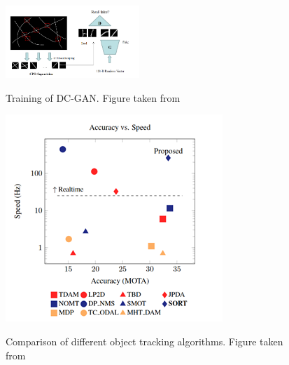 \documentclass[11pt]{article}		%
\newlength{\imageheight}	 %
\begin{document}
         	\begin{figure}[h]
				\centering
				\begin{multicols}{2}
					\includegraphics[width=0.45\textwidth]{Generative_CPO_CrackGan}
					\caption{Training of DC-GAN. Figure taken from \cite{CrackGAN1}}
					\label{Generative_CPO_CrackGan}
					\columnbreak
    				\includegraphics[height=\imageheight] {comparison_object_tracking}
    				\caption{Comparison of different object tracking algorithms. Figure taken from} \cite{object_tracking}
    				\label{object_tracking_comp}
				\end{multicols}
			\end{figure}
			
\end{document}
